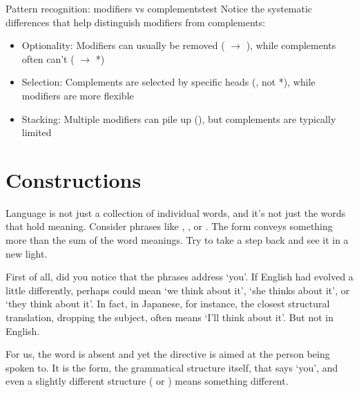 \ea\label{ex:relative-contrast}
    \z
\z

\begin{tblsframedsymbol}{Pattern recognition: modifiers vs complements}{test}
Notice the systematic differences that help distinguish modifiers from complements:
\begin{itemize}[noitemsep, leftmargin=*]
    \item Optionality: Modifiers can usually be removed ( $\rightarrow$ ), while complements often can't ( $\rightarrow$ *)
    \item Selection: Complements are selected by specific heads (, not *), while modifiers are more flexible
    \item Stacking: Multiple modifiers can pile up (), but complements are typically limited
\end{itemize}
\end{tblsframedsymbol}

\section{Constructions}\label{sec:constructions}
Language is not just a collection of individual words, and it's not just the words that hold meaning. Consider phrases like , , or . The form conveys something more than the sum of the word meanings. Try to take a step back and see it in a new light.

First of all, did you notice that the phrases address `you'. If English had evolved a little differently, perhaps  could mean `we think about it', `she thinks about it', or `they think about it'. In fact, in Japanese, for instance, the closest structural translation, dropping the subject, often means `I'll think about it'. But not in English.

For us, the word  is absent and yet the directive is aimed at the person being spoken to. It is the form, the grammatical structure itself, that says `you', and even a slightly different structure ( or ) means something different.

